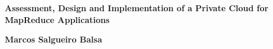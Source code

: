 \section*{}

\begin{center}

\vspace*{\fill}

{\huge \bf{Assessment, Design and Implementation of a Private Cloud for MapReduce Applications}}

\vspace{9.8cm}

\textbf{Marcos Salgueiro Balsa}

\end{center}

\vspace*{\fill}